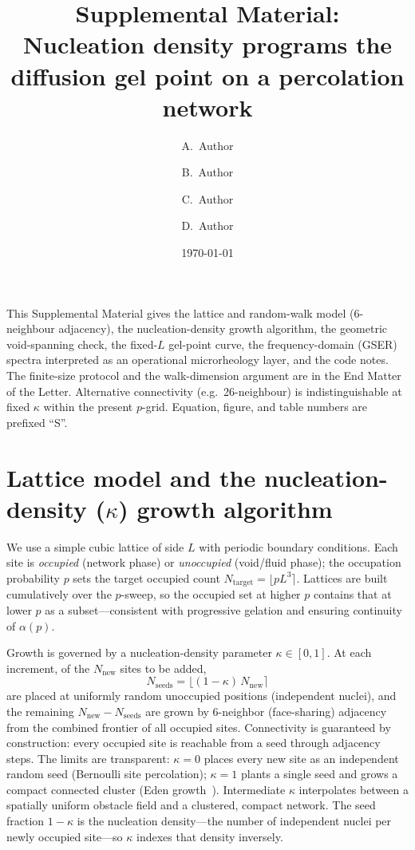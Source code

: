 \documentclass[aps,prl,onecolumn,superscriptaddress,nofootinbib,longbibliography]{revtex4-2}
\newcommand{\kap}{\kappa}
\begin{document}
\title{Supplemental Material:\\ Nucleation density programs the diffusion gel point on a percolation network}
\author{A.~Author}
\author{B.~Author}
\author{C.~Author}
\author{D.~Author}
\affiliation{[Affiliation], [Institution], [City], [Country]}
\date{\today}
\maketitle

This Supplemental Material gives the lattice and random-walk model (6-neighbour adjacency),
the nucleation-density growth algorithm, the geometric void-spanning check, the fixed-$L$
gel-point curve, the frequency-domain (GSER) spectra interpreted as an operational
microrheology layer, and the code notes. The finite-size protocol and the walk-dimension
argument are in the End Matter of the Letter. Alternative connectivity (e.g.\ 26-neighbour)
is indistinguishable at fixed $\kap$ within the present $p$-grid. Equation, figure, and
table numbers are prefixed ``S''.

\section{Lattice model and the nucleation-density ($\kap$) growth algorithm}
We use a simple cubic lattice of side $L$ with periodic boundary conditions. Each site is
\emph{occupied} (network phase) or \emph{unoccupied} (void/fluid phase); the occupation
probability $p$ sets the target occupied count $N_{\mathrm{target}}=\lfloor pL^3\rceil$.
Lattices are built cumulatively over the $p$-sweep, so the occupied set at higher $p$ contains
that at lower $p$ as a subset---consistent with progressive gelation and ensuring continuity of
$\alpha(p)$.

Growth is governed by a nucleation-density parameter $\kap\in[0,1]$. At each increment, of the
$N_{\mathrm{new}}$ sites to be added,
\begin{equation}
  N_{\mathrm{seeds}}=\big\lfloor(1-\kap)\,N_{\mathrm{new}}\big\rceil
\end{equation}
are placed at uniformly random unoccupied positions (independent nuclei), and the remaining
$N_{\mathrm{new}}-N_{\mathrm{seeds}}$ are grown by 6-neighbor (face-sharing) adjacency from the
combined frontier of all occupied sites. Connectivity is guaranteed by construction: every
occupied site is reachable from a seed through adjacency steps. The limits are transparent:
$\kap=0$ places every new site as an independent random seed (Bernoulli site percolation);
$\kap=1$ plants a single seed and grows a compact connected cluster (Eden growth~\cite{Eden1961}).
Intermediate $\kap$ interpolates between a spatially uniform obstacle field and a clustered,
compact network. The seed fraction $1-\kap$ is the nucleation density---the number of
independent nuclei per newly occupied site---so $\kap$ indexes that density
inversely.
\end{document}
